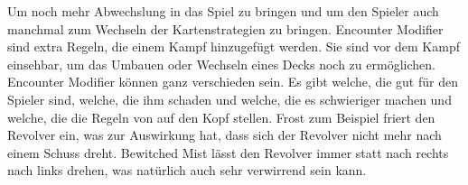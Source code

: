 Um noch mehr Abwechslung in das Spiel zu bringen und um den Spieler auch manchmal zum Wechseln der Kartenstrategien zu bringen.
Encounter Modifier sind extra Regeln, die einem Kampf hinzugefügt werden.
Sie sind vor dem Kampf einsehbar, um das Umbauen oder Wechseln eines Decks noch zu ermöglichen.
Encounter Modifier können ganz verschieden sein.
Es gibt welche, die gut für den Spieler sind, welche, die ihm schaden und welche, die es schwieriger machen und welche, die die Regeln von \FF auf den Kopf stellen.
Frost zum Beispiel friert den Revolver ein, was zur Auswirkung hat, dass sich der Revolver nicht mehr nach einem Schuss dreht.
Bewitched Mist lässt den Revolver immer statt nach rechts nach links drehen, was natürlich auch sehr verwirrend sein kann.




\renewcommand{\kapitelautor}{}

